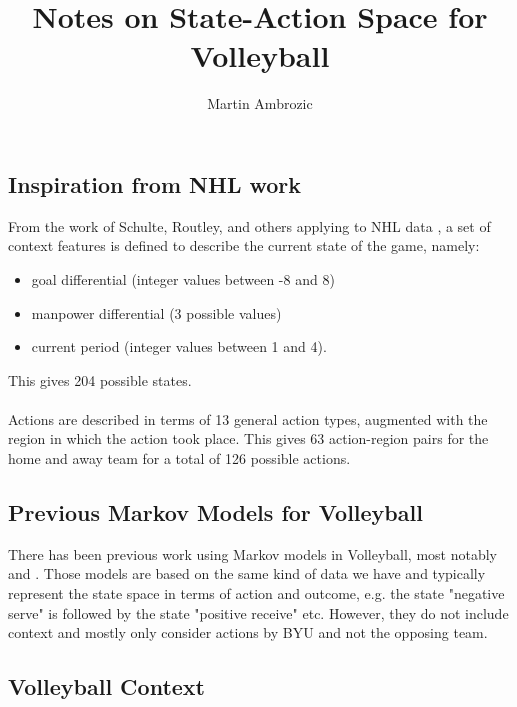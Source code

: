 \documentclass[12pt,letter]{article}
\author{Martin Ambrozic}
\title{Notes on State-Action Space for Volleyball}
\date{}
\begin{document}
	
	\maketitle
	
	\subsection*{Inspiration from NHL work}
	
	From the work of Schulte, Routley, and others applying to NHL data \cite{routley2015markov, schulte2017apples, schulte2017markov}, a set of context features is defined to describe the current state of the game, namely:
	\begin{itemize}
		\item goal differential (integer values between -8 and 8)
		\item manpower differential (3 possible values)
		\item current period (integer values between 1 and 4).
	\end{itemize}
	This gives 204 possible states.
	\\\\
	Actions are described in terms of 13 general action types, augmented with the region in which the action took place. This gives 63 action-region pairs for the home and away team for a total of 126 possible actions.
	
	
	\subsection*{Previous Markov Models for Volleyball}
	
	There has been previous work using Markov models in Volleyball, most notably \cite{florence2008skill} and \cite{miskin2010skill}. Those models are based on the same kind of data we have and typically represent the state space in terms of action and outcome, e.g. the state "negative serve" is followed by the state "positive receive" etc. However, they do not include context and mostly only consider actions by BYU and not the opposing team.
	
	\subsection*{Volleyball Context}
	
\end{document}
